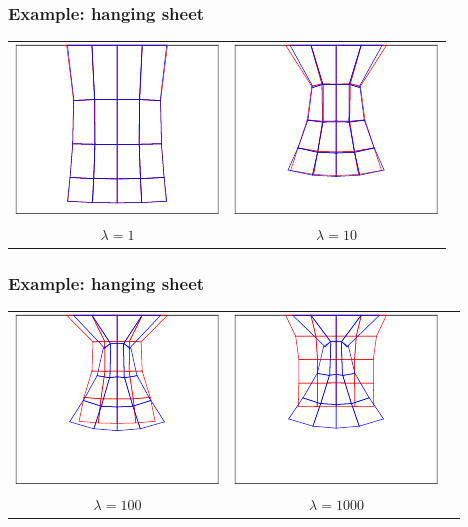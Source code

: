 \documentclass[american,ignorenonframetext,notheorems]{beamer}
\begin{document}
\begin{frame}
  \frametitle{Example: hanging sheet}
  \centering
  \begin{tabular}{cc}
    \includegraphics[width=.45\textwidth]{./graph/elasticity/stalactite-0}
    &\includegraphics[width=.45\textwidth]{./graph/elasticity/stalactite-1}
    \\
    $\lambda = 1$&$\lambda = 10$
  \end{tabular}
\end{frame}

\begin{frame}
  \frametitle{Example: hanging sheet}
  \centering
  \begin{tabular}{ccc}
    \includegraphics[width=.45\textwidth]{./graph/elasticity/stalactite-2}
    &\includegraphics[width=.45\textwidth]{./graph/elasticity/stalactite-3}
    \\
    $\lambda = 100$&$\lambda = 1000$
  \end{tabular}
\end{frame}
\end{document}
